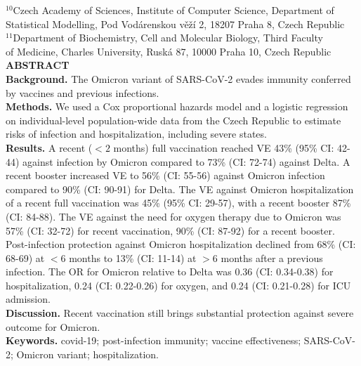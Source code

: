 \documentclass[a4paper,12pt]{article}
\begin{document}
$^{10}$Czech Academy of Sciences, Institute of Computer Science, Department of Statistical Modelling, Pod Vodárenskou věží 2, 18207 Praha 8, Czech Republic \\[1ex]
$^{11}$Department of Biochemistry, Cell and Molecular Biology, Third Faculty \\ of Medicine, Charles University, Ruská 87, 10000 Praha 10, Czech Republic \\[3ex]
\noindent
\vspace{1ex}
\noindent
{\bf ABSTRACT} \\[1ex]
{\bf Background.} The Omicron variant of SARS-CoV-2 evades immunity conferred by vaccines and previous infections. \\
{\bf Methods.} We used a Cox proportional hazards model and a logistic regression on individual-level population-wide data from the Czech Republic to estimate risks of infection and hospitalization, including severe states.\\
{\bf Results.} A recent ($<2$ months) full vaccination reached VE 43\% (95\% CI: 42-44) against infection by Omicron compared to 73\% (CI: 72-74) against Delta. A recent booster increased VE to 56\% (CI: 55-56) against Omicron infection compared to 90\% (CI: 90-91) for Delta. The VE against Omicron hospitalization of a recent full vaccination was 45\% (95\% CI: 29-57), with a recent booster 87\% (CI: 84-88). The VE against the need for oxygen therapy due to Omicron was 57\% (CI: 32-72) for recent vaccination, 90\% (CI: 87-92) for a recent booster. Post-infection protection against Omicron hospitalization declined from 68\% (CI: 68-69) at $<6$ months to 13\% (CI: 11-14) at $>6$ months after a previous infection. The OR for Omicron relative to Delta was 0.36 (CI: 0.34-0.38) for hospitalization, 0.24 (CI: 0.22-0.26) for oxygen, and 0.24 (CI: 0.21-0.28) for ICU admission.\\
{\bf Discussion.} Recent vaccination still brings substantial protection against severe outcome for Omicron.
\\[1ex]
{\bf Keywords.} covid-19; post-infection immunity; vaccine effectiveness; SARS-CoV-2; Omicron variant; hospitalization. \\[1ex]

\setlength{\parindent}{0cm}
\end{document}
